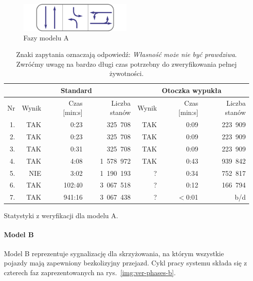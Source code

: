 \documentclass{pracamgr}
\newcommand{\imgr}[1]{rys.~\ref{#1}}
\theoremstyle{plain}
\begin{document}
\begin{figure}[ht]
  \centering
  \includegraphics[width=0.5\textwidth]{img/ver-a-cycle}
  \caption{Fazy modelu A}
  \label{img:ver-phases-a}
\end{figure}
\begin{table}[ht]
  \centering
  \begin{tabular}{|r||r|r|r||r|r|r||}
    \hline
    & \multicolumn{3}{c||}{\bf Standard} & \multicolumn{3}{c||}{\bf
      Otoczka wypukła} \\ \hline
    Nr   & Wynik & Czas [min:s] & Liczba stanów & Wynik & Czas [min:s] &
    Liczba stanów \\ \hline
    1. & TAK & 0:23   &  325~708 & TAK & 0:09 & 223~909 \\
    2. & TAK & 0:23   &  325~708 & TAK & 0:09 & 223~909 \\
    3. & TAK & 0:31   &  325~708 & TAK & 0:09 & 223~909 \\
    4. & TAK & 4:08   & 1~578~972 & TAK & 0:43 & 939~842 \\
    5. & NIE & 3:02   & 1~190~193 & ?   & 0:34 & 752~817 \\
    6. & TAK & 102:40 & 3~067~518 & ?   & 0:12 & 166~794 \\
    7. & TAK & 941:16 & 3~067~438 & ?   & $<$0:01   &     b/d  
    \\\hline
  \end{tabular}
  \caption{Statystyki z weryfikacji dla modelu A.}
  \caption*{Znaki zapytania oznaczają odpowiedź: \emph{Własność może
      nie być prawdziwa}. Zwróćmy uwagę na bardzo długi czas potrzebny
  do zweryfikowania pełnej żywotności.}
  \label{tab:ver-stats-a}
\end{table}

\paragraph{Model B} Model B reprezentuje sygnalizację dla
skrzyżowania, na którym wszystkie pojazdy mają zapewniony bezkolizyjny
przejazd. Cykl pracy systemu składa się z czterech faz
zaprezentowanych na \imgr{img:ver-phases-b}.
\end{document}
